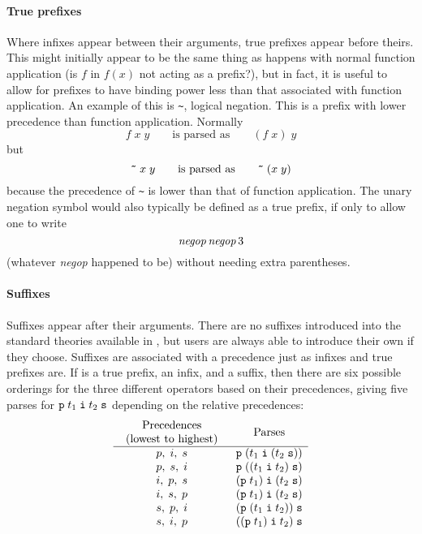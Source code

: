 {\paragraph{True prefixes}

Where infixes appear between their arguments, true prefixes appear
before theirs.  This might initially appear to be the same thing as
happens with normal function application (is $f$ in $f(x)$ not acting
as a prefix?), but in fact, it is useful to allow for prefixes to have
binding power less than that associated with function application.  An
example of this is \verb+~+, logical negation.  This is a prefix with
lower precedence than function application.  Normally
\[
   f\;x\; y\qquad \mbox{is parsed as}\qquad (f\; x)\; y
\] but \[
  \holtxt{\~{}}\; x\; y\qquad\mbox{is parsed as}\qquad
  \holtxt{\~{}}\; (x\; y)
\] because the precedence of \verb+~+ is lower than that of function
application.  The unary negation symbol would also typically be
defined as a true prefix, if only to allow one to write \[ {\it
  negop}\,{\it negop}\,3
\] (whatever {\it negop} happened to be) without needing extra parentheses.

\paragraph{Suffixes}

Suffixes appear after their arguments.  There are no suffixes
introduced into the standard theories available in \HOL{}, but users
are always able to introduce their own if they choose.  Suffixes are
associated with a precedence just as infixes and true prefixes are.
If  is a true prefix,  an infix, and  a
suffix, then there are six possible orderings for the three different
operators based on their precedences, giving five parses for
$\holtxt{p}\; t_1\; \holtxt{i}\; t_2\; \holtxt{s}$ depending on the
relative precedences:
\[
\begin{array}{cl}
\mbox{\begin{tabular}{c}Precedences\\(lowest to highest)\end{tabular}} &
\multicolumn{1}{c}{\mbox{Parses}}\\
\hline
p,\;i,\;s & \holtxt{p}\;(t_1\;\holtxt{i}\;(t_2\;\holtxt{s}))\\
p,\;s,\;i & \holtxt{p}\;((t_1\;\holtxt{i}\;t_2)\;\holtxt{s})\\
i,\;p,\;s & (\holtxt{p}\;t_1)\;\holtxt{i}\;(t_2\;\holtxt{s})\\
i,\;s,\;p & (\holtxt{p}\;t_1)\;\holtxt{i}\;(t_2\;\holtxt{s})\\
s,\;p,\;i & (\holtxt{p}\;(t_1\;\holtxt{i}\;t_2))\;\holtxt{s}\\
s,\;i,\;p & ((\holtxt{p}\;t_1)\;\holtxt{i}\;t_2)\;\holtxt{s}\\
\end{array}
\]

}
